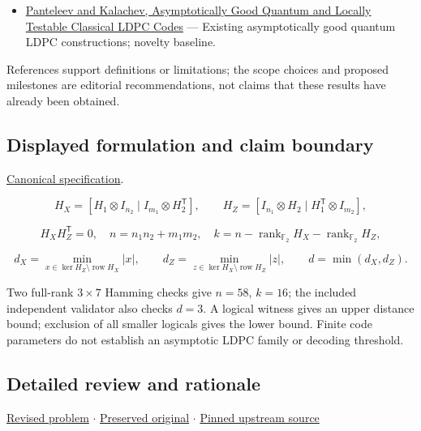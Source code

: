 \documentclass[
  11pt,
]{article}
\providecommand{\tightlist}{%
  \setlength{\itemsep}{0pt}\setlength{\parskip}{0pt}}
\begin{document}
\begin{itemize}
\tightlist
\item
  \href{https://arxiv.org/abs/2111.03654}{Panteleev and Kalachev,
  Asymptotically Good Quantum and Locally Testable Classical LDPC Codes}
  --- Existing asymptotically good quantum LDPC constructions; novelty
  baseline.
\end{itemize}

References support definitions or limitations; the scope choices and
proposed milestones are editorial recommendations, not claims that these
results have already been obtained.

\subsection{Displayed formulation and claim boundary}

\href{https://github.com/rick-stevens-ai/Pure-Thought/blob/main/PRDs/21-Quantum-LDPC-Codes.md}{Canonical
specification}.

\[H_X=[H_1\otimes I_{n_2}\mid I_{m_1}\otimes H_2^{\mathsf T}],
\qquad H_Z=[I_{n_1}\otimes H_2\mid H_1^{\mathsf T}\otimes I_{m_2}],\]

\[H_XH_Z^{\mathsf T}=0,\quad n=n_1n_2+m_1m_2,\quad
k=n-\operatorname{rank}_{\mathbb F_2}H_X-\operatorname{rank}_{\mathbb F_2}H_Z,\]

\[d_X=\min_{x\in\ker H_Z\setminus\operatorname{row}H_X}|x|,
\qquad d_Z=\min_{z\in\ker H_X\setminus\operatorname{row}H_Z}|z|,
\qquad d=\min(d_X,d_Z).\]

Two full-rank \(3\times7\) Hamming checks give \(n=58\), \(k=16\); the
included independent validator also checks \(d=3\). A logical witness
gives an upper distance bound; exclusion of all smaller logicals gives
the lower bound. Finite code parameters do not establish an asymptotic
LDPC family or decoding threshold.

\subsection{Detailed review and rationale}

\href{https://github.com/rick-stevens-ai/Pure-Thought/blob/main/PRDs/21-Quantum-LDPC-Codes.md}{Revised
problem} \ensuremath{\cdot}
\href{https://github.com/rick-stevens-ai/Pure-Thought/blob/main/archive/original-PRDs/21-Quantum-LDPC-Codes.md}{Preserved
original} \ensuremath{\cdot}
\href{https://github.com/rick-stevens-ai/Pure-Thought/blob/f854d4e12b55c1f5b5c2a964b75f2d23496d981e/PRDs/21-Quantum-LDPC-Codes.md}{Pinned
upstream source}
\end{document}
